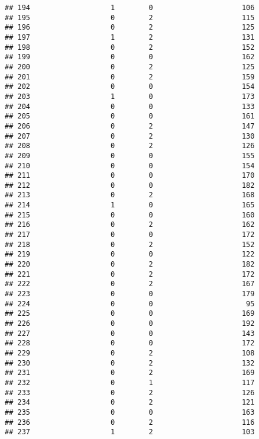 \documentclass[]{article}
\begin{document}
\begin{verbatim}
## 194                   1        0                     106
## 195                   0        2                     115
## 196                   0        2                     125
## 197                   1        2                     131
## 198                   0        2                     152
## 199                   0        0                     162
## 200                   0        2                     125
## 201                   0        2                     159
## 202                   0        0                     154
## 203                   1        0                     173
## 204                   0        0                     133
## 205                   0        0                     161
## 206                   0        2                     147
## 207                   0        2                     130
## 208                   0        2                     126
## 209                   0        0                     155
## 210                   0        0                     154
## 211                   0        0                     170
## 212                   0        0                     182
## 213                   0        2                     168
## 214                   1        0                     165
## 215                   0        0                     160
## 216                   0        2                     162
## 217                   0        0                     172
## 218                   0        2                     152
## 219                   0        0                     122
## 220                   0        2                     182
## 221                   0        2                     172
## 222                   0        2                     167
## 223                   0        0                     179
## 224                   0        0                      95
## 225                   0        0                     169
## 226                   0        0                     192
## 227                   0        0                     143
## 228                   0        0                     172
## 229                   0        2                     108
## 230                   0        2                     132
## 231                   0        2                     169
## 232                   0        1                     117
## 233                   0        2                     126
## 234                   0        2                     121
## 235                   0        0                     163
## 236                   0        2                     116
## 237                   1        2                     103

\end{verbatim}
\end{document}
